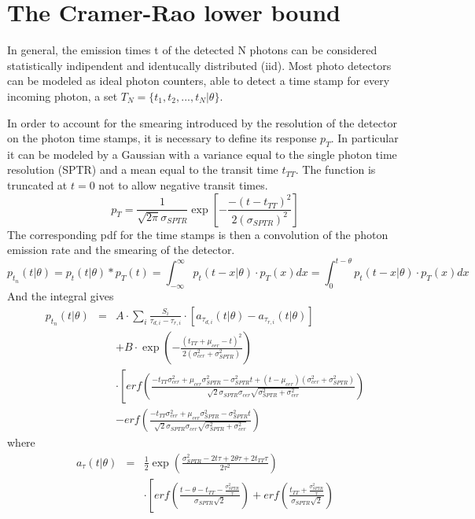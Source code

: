 \section{The Cramer-Rao lower bound}
In general, the emission times t of the detected N photons can be considered statistically indipendent and identucally distributed (iid).
Most photo detectors can be modeled as ideal photon counters, able to detect a time stamp for every incoming photon, a set $T_{N} = \{ t_{1}, t_{2}, ..., t_{N}|\theta \}$.

In order to account for the smearing introduced by the resolution of the detector on the photon time stamps, it is necessary to define its response $p_{T}$. In particular  it can be modeled by a Gaussian with a variance equal to the single photon time resolution (SPTR) and a mean equal to the transit time $t_{TT}$. The function is truncated at $t=0$ not to allow negative transit times.
\begin{equation}
p_{T} = \frac{1}{\sqrt {2\pi} \sigma _{SPTR}} \exp{\left[-\frac{-(t-t_{TT})^{2}}{2(\sigma _{SPTR})^{2}}\right]}
\end{equation}
The corresponding pdf for the time stamps is then a convolution of the photon emission rate and the smearing of the detector.
\begin{equation}
p_{t_{n}}(t|\theta) = p_{t}(t|\theta)\ast p_{T}(t)= \int _{-\infty}^{\infty}p_{t}(t-x|\theta) \cdot p_{T}(x)dx = \int _{0}^{t-\theta}p_{t}(t-x|\theta) \cdot p_{T}(x)dx
\end{equation}
And the integral gives
\begin{eqnarray}
p_{t_{n}}(t|\theta) &=& A \cdot \sum _{i} \frac{S_{i}}{\tau _{d,i} - \tau _{r,i}} \cdot \left[ a_{\tau _{d, i}}(t|\theta) - a_{\tau _{r,i}}(t|\theta)\right]\\
&& + B \cdot \exp{\left( -\frac{(t_{TT} + \mu _{cer} - t)^{2}}{2(\sigma _{cer}^{2}+ \sigma _{SPTR}^{2})} \right)}\\
&& \cdot \left[ erf\left( \frac{-t_{TT}\sigma _{cer}^{2} + \mu _{cer} \sigma _{SPTR}^{2} -\sigma _{SPTR} ^{2}t +(t-\mu _{cer})(\sigma _{cer}^{2}+\sigma _{SPTR}^{2})}{\sqrt{2}\sigma _{SPTR}\sigma_{cer}\sqrt{\sigma _{SPTR}^{2}+\sigma_{cer}^{2}}} \right)\\
&& - erf \left( \frac{-t_{TT}\sigma _{cer}^{2} + \mu _{cer} \sigma _{SPTR}^{2} -\sigma _{SPTR} ^{2}t}{\sqrt{2}\sigma _{SPTR}\sigma_{cer}\sqrt{\sigma _{SPTR}^{2}+\sigma_{cer}^{2}}} \right)
\end{eqnarray}
where 
\begin{eqnarray}
a _{\tau}(t|\theta) &=& \frac{1}{2} \exp{\left(\frac{\sigma _{SPTR} ^{2} - 2t\tau +2\theta \tau + 2t_{TT}\tau}{2\tau ^{2}}\right)} \\
&& \cdot \left[ erf\left( \frac{t-\theta -t_{TT} - \frac{\sigma ^{2}_{SPTR}}{\tau}}{\sigma _{SPTR}\sqrt{2}} \right) + erf \left( \frac{t_{TT}+\frac{\sigma ^{2} _{SPTR}}{\tau}}{\sigma _{SPTR}\sqrt{2}} \right)
\end{eqnarray}
